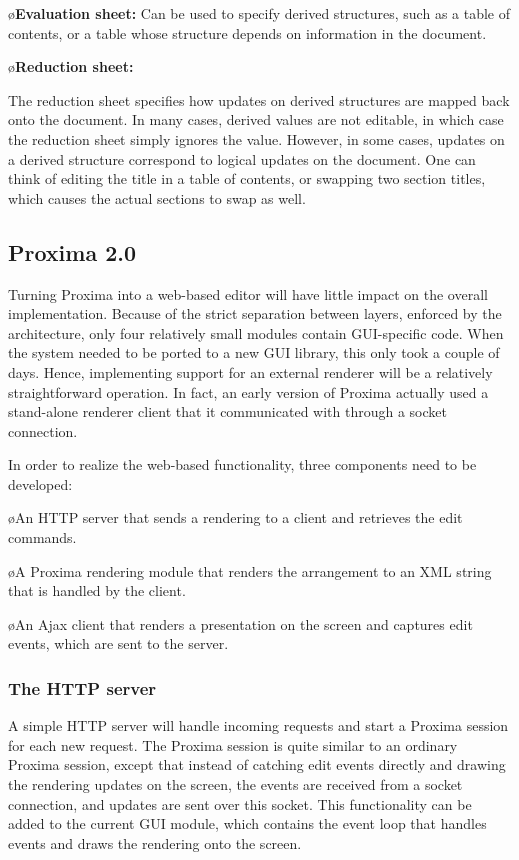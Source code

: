 \documentclass[10pt]{article}
\begin{document}
\bl
\o{\bf Evaluation sheet:}
Can be used to specify derived structures, such as a table of contents, or a table whose structure depends on information in the document. 

\o{\bf Reduction sheet:}

The reduction sheet specifies how updates on derived structures are mapped back onto the document. In many cases, derived values are not editable, in which case the reduction sheet simply ignores the value. However, in some cases, updates on a derived structure correspond to logical updates on the document. One can think of editing the title in a table of contents, or swapping two section titles, which causes the actual sections to swap as well. 
\el


\subsection{Proxima 2.0}

Turning Proxima into a web-based editor will have little impact on the overall implementation. Because of the strict separation between layers, enforced by the architecture, only four relatively small modules contain GUI-specific code. When the system needed to be ported to a new GUI library, this only took a couple of days. Hence, implementing support for an external renderer will be a relatively straightforward operation. In fact, an early version of Proxima actually used a stand-alone renderer client that it communicated with through a socket connection.

In order to realize the web-based functionality, three components need to be developed:

\bl
\o An HTTP server that sends a rendering to a client and retrieves the edit commands. 

\o A Proxima rendering module that renders the arrangement to an XML string that is handled by the client.

\o An Ajax client that renders a presentation on the screen and captures edit events, which are sent to the server.
\el

\subsubsection{The HTTP server}

A simple HTTP server will handle incoming requests and start a Proxima session for each new request. The Proxima session is quite similar to an ordinary Proxima session, except that instead of catching edit events directly and drawing the rendering updates on the screen, the events are received from a socket connection, and updates are sent over  this socket. This functionality can be added to the current GUI module, which contains the event loop that handles events and draws the rendering onto the screen. 
 
\end{document}
